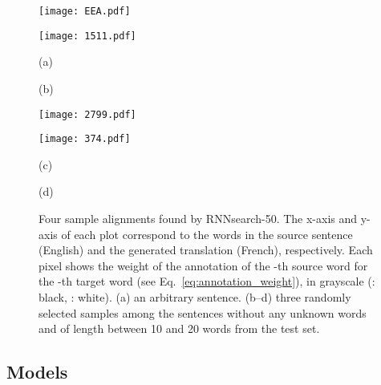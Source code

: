 \begin{figure}[t]
    \centering
    \begin{minipage}[b]{0.48\textwidth}
        \raggedleft
        \texttt{[image: EEA.pdf]}
    \end{minipage}
    \hfill
    \begin{minipage}[b]{0.48\textwidth}
        \raggedleft
        \texttt{[image: 1511.pdf]}
    \end{minipage}

    \begin{minipage}{0.48\textwidth}
        \centering
        (a)
    \end{minipage}
    \hfill
    \begin{minipage}{0.48\textwidth}
        \centering
        (b)
    \end{minipage}

    \begin{minipage}[b]{0.48\textwidth}
        \raggedleft
        \texttt{[image: 2799.pdf]}
    \end{minipage}
    \hfill
    \begin{minipage}[b]{0.48\textwidth}
        \raggedleft
        \texttt{[image: 374.pdf]}
    \end{minipage}

    \begin{minipage}{0.48\textwidth}
        \centering
        (c)
    \end{minipage}
    \hfill
    \begin{minipage}{0.48\textwidth}
        \centering
        (d)
    \end{minipage}

    \caption{
        Four sample alignments found by RNNsearch-50. The x-axis and y-axis of
        each plot correspond to the words in the source sentence (English) and
        the generated translation (French), respectively. Each pixel shows the
        weight  of the annotation of the -th source word for the
        -th target word (see Eq.~\eqref{eq:annotation_weight}), in grayscale
        (: black, : white). (a) an arbitrary sentence. (b--d) three
        randomly selected samples among the sentences without any unknown words
        and of length between 10 and 20 words from the test set.
    }
    \label{fig:alignment}
\end{figure}

\subsection{Models}

